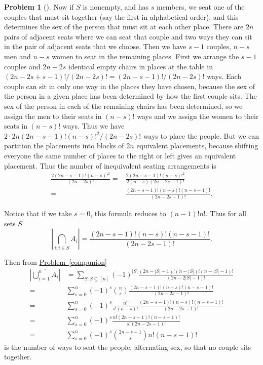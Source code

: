 \documentclass[10pt,]{book}
\theoremstyle{plain}
\theoremstyle{definition}
\newtheorem{activity}[project]{Problem}
\theoremstyle{definition}
\numberwithin{equation}{chapter}
\newcommand{\amp}{&}
\begin{document}
\begin{activity}[]
Now if \(S\) is nonempty, and has \(s\) members, we seat one of the couples that must sit together (say the first in alphabetical order), and this determines the sex of the person that must sit at each other place. There are \(2n\) pairs of adjacent seats where we can seat that couple and two ways they can sit in the pair of adjacent seats that we choose. Then we have \(s-1\) couples, \(n-s\) men and \(n-s\) women to seat in the remaining places. First we arrange the \(s-1\) couples and \(2n-2s\) identical empty chairs in places at the table in \((2n-2s+s-1)!/(2n-2s)!=(2n-s-1)!/(2n-2s)!\) ways. Each couple can sit in only one way in the places they have chosen, because the sex of the person in a given place has been determined by how the first couple sits. The sex of the person in each of the remaining chairs has been determined, so we assign the men to their seats in \((n-s)!\) ways and we assign the women to their seats in \((n-s)!\) ways. Thus we have \(2\cdot2n(2n-s-1)!(n-s)!^2/(2n-2s)!\) ways to place the people. But we can partition the placements into blocks of \(2n\) equivalent placements, because shifting everyone the same number of places to the right or left gives an equivalent placement. Thus the number of inequivalent seating arrangements is%
\begin{align*}
\frac{2(2n-s-1)!(n-s)!^2}{(2n-2s)!} =\amp \frac{2(2n-s-1)!(n-s)!^2}{2(n-s)(2n-2s-1)!}\\
=\amp \frac{(2n-s-1)!(n-s)!(n-s-1)!}{(2n-2s-1)!}.
\end{align*}
%
\par
Notice that if we take \(s=0\), this formula reduces to \((n-1)!n!\). Thus for all sets \(S\)%
\begin{equation*}
\left|\bigcap_{i\colon i\in S} A_i\right|=\frac{(2n-s-1)!(n-s)!(n-s-1)!}{(2n-2s-1)!}\text{.}
\end{equation*}
%
\par
Then from \hyperref[compunion]{Problem~\ref{compunion}}%
\begin{align*}
\left|\overline{\bigcup_{i=1}^n A_i}\right|  &= \sum_{S:S\subseteq [n]} (-1)^{|S|}\frac{(2n-|S|-1)!(n-|S|)!(n-|S|-1)!
}{(2n-2|S|-1)!}\\
=\amp \sum_{s=0}^n(-1)^s\binom{n}{s}\frac{(2n-s-1)!(n-s)!(n-s-1)!}{(2n-2s-1)!}\\
=\amp \sum_{s=0}^n(-1)^s\frac{n!}{s!(n-s)!}\frac{(2n-s-1)!(n-s)!(n-s-1)!}{(2n-2s-1)!}\\
=\amp \sum_{s=0}^n(-1)^s \frac{n!(2n-s-1)!(n-s-1)!}{s!(2n-2s-1)!}\\
=\amp \sum_{s=0}^n(-1)^s\binom{2n-s-1}{s}n!(n-s-1)!
\end{align*}
is the number of ways to seat the people, alternating sex, so that no couple sits together.%
\end{activity}
\typeout{************************************************}
\typeout{************************************************}
\end{document}
